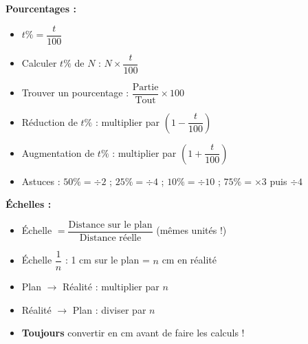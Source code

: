 \begin{summarybox}[L'essentiel]
	\textbf{Pourcentages :}
	\begin{itemize}
		\item $t\% = \dfrac{t}{100}$
		\item Calculer $t\%$ de $N$ : $N \times \dfrac{t}{100}$
		\item Trouver un pourcentage : $\dfrac{\text{Partie}}{\text{Tout}} \times 100$
		\item Réduction de $t\%$ : multiplier par $(1 - \dfrac{t}{100})$
		\item Augmentation de $t\%$ : multiplier par $(1 + \dfrac{t}{100})$
		\item Astuces : $50\% = \div 2$ ; $25\% = \div 4$ ; $10\% = \div 10$ ; $75\% = \times 3$ puis $\div 4$
	\end{itemize}

	\textbf{Échelles :}
	\begin{itemize}
		\item Échelle $= \dfrac{\text{Distance sur le plan}}{\text{Distance réelle}}$ (mêmes unités !)
		\item Échelle $\dfrac{1}{n}$ : 1 cm sur le plan = $n$ cm en réalité
		\item Plan $\rightarrow$ Réalité : multiplier par $n$
		\item Réalité $\rightarrow$ Plan : diviser par $n$
		\item \textbf{Toujours} convertir en cm avant de faire les calculs !
	\end{itemize}
\end{summarybox}
